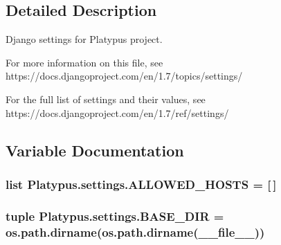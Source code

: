 \subsection{Detailed Description}
\begin{DoxyVerb}Django settings for Platypus project.

For more information on this file, see
https://docs.djangoproject.com/en/1.7/topics/settings/

For the full list of settings and their values, see
https://docs.djangoproject.com/en/1.7/ref/settings/
\end{DoxyVerb}
 

\subsection{Variable Documentation}
\hypertarget{namespace_platypus_1_1settings_acef7d412cd11e277899731742228d304}{}
\subsubsection[{A\+L\+L\+O\+W\+E\+D\+\_\+\+H\+O\+S\+T\+S}]{\setlength{\rightskip}{0pt plus 5cm}list Platypus.\+settings.\+A\+L\+L\+O\+W\+E\+D\+\_\+\+H\+O\+S\+T\+S = \mbox{[}$\,$\mbox{]}}\label{namespace_platypus_1_1settings_acef7d412cd11e277899731742228d304}
\hypertarget{namespace_platypus_1_1settings_ab0d13a750bebbc2d9e19f32adc2ff749}{}
\subsubsection[{B\+A\+S\+E\+\_\+\+D\+I\+R}]{\setlength{\rightskip}{0pt plus 5cm}tuple Platypus.\+settings.\+B\+A\+S\+E\+\_\+\+D\+I\+R = os.\+path.\+dirname(os.\+path.\+dirname(\+\_\+\+\_\+file\+\_\+\+\_\+))}\label{namespace_platypus_1_1settings_ab0d13a750bebbc2d9e19f32adc2ff749}
\hypertarget{namespace_platypus_1_1settings_a52c253859b1798aee0972f29f3c94f00}{}
